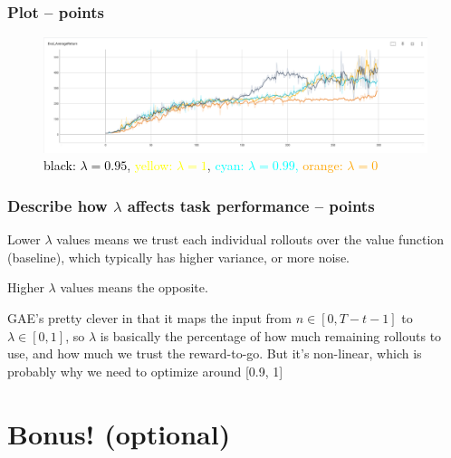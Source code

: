 \documentclass{article}
\begin{document}
\subsubsection{Plot --  points\rbrack}
\begin{answer}[title=Q8.1.2,height=10cm,width=\linewidth]
    \begin{figure}[H]
        \centering
        \includegraphics[width=.99\linewidth]{figs/Q8.png}
        \caption{\textcolor{black}{black: $\lambda = 0.95$}, \textcolor{yellow}{yellow: $\lambda = 1$}, \textcolor{cyan}{cyan: $\lambda = 0.99$, \textcolor{orange}{orange: $\lambda = 0$}}}
    \end{figure}
\end{answer}

\subsubsection{Describe how $\lambda$ affects task performance --  points\rbrack}
\begin{answer}[title=Q8.1.3,height=4cm,width=\linewidth]
    Lower $\lambda$ values means we trust each individual rollouts over the value function (baseline), which typically has higher variance, or more noise.

    Higher $\lambda$ values means the opposite.

    GAE's pretty clever in that it maps the input from $n \in [0, T - t - 1]$ to $\lambda \in [0, 1]$, so $\lambda$ is basically the percentage of how much remaining rollouts to use, and how much we trust the reward-to-go.
    But it's non-linear, which is probably why we need to optimize around [0.9, 1]
\end{answer}

\clearpage

\section{Bonus! (optional)}
\end{document}
